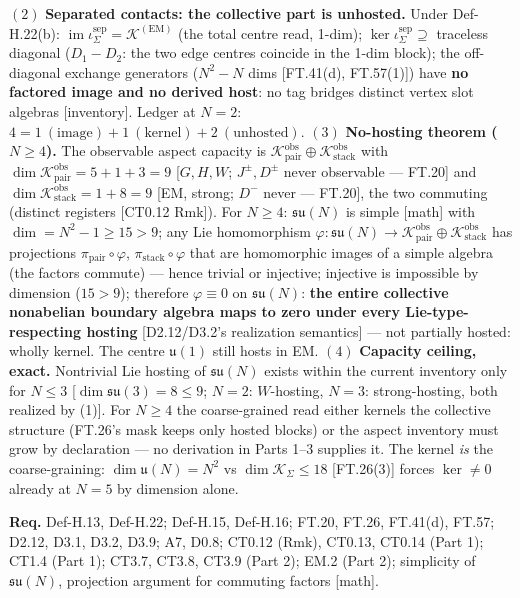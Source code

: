 \begin{theorem}
$(2)$ \textbf{Separated contacts: the collective part is unhosted.} Under Def-H.22(b): $\operatorname{im}\iota_\Sigma^{\mathrm{sep}}=\mathcal K^{(\mathrm{EM})}$ (the total centre read, 1-dim); $\ker\iota_\Sigma^{\mathrm{sep}}\supseteq$ traceless diagonal ($D_1-D_2$: the two edge centres coincide in the 1-dim block); the off-diagonal exchange generators ($N^2-N$ dims [FT.41(d), FT.57(1)]) have \textbf{no factored image and no derived host}: no tag bridges distinct vertex slot algebras [inventory]. Ledger at $N=2$: $4=1\ (\text{image})+1\ (\text{kernel})+2\ (\text{unhosted})$. $(3)$ \textbf{No-hosting theorem ($N\ge4$).} The observable aspect capacity is $\mathcal K_{\mathrm{pair}}^{\mathrm{obs}}\oplus\mathcal K_{\mathrm{stack}}^{\mathrm{obs}}$ with $\dim\mathcal K_{\mathrm{pair}}^{\mathrm{obs}}=5{+}1{+}3=9$ [$G,H,W$; $J^\pm,D^\pm$ never observable — FT.20] and $\dim\mathcal K_{\mathrm{stack}}^{\mathrm{obs}}=1{+}8=9$ [EM, strong; $D^-$ never — FT.20], the two commuting (distinct registers [CT0.12 Rmk]). For $N\ge4$: $\mathfrak{su}(N)$ is simple [math] with $\dim=N^2-1\ge15>9$; any Lie homomorphism $\varphi:\mathfrak{su}(N)\to\mathcal K_{\mathrm{pair}}^{\mathrm{obs}}\oplus\mathcal K_{\mathrm{stack}}^{\mathrm{obs}}$ has projections $\pi_{\mathrm{pair}}\circ\varphi$, $\pi_{\mathrm{stack}}\circ\varphi$ that are homomorphic images of a simple algebra (the factors commute) — hence trivial or injective; injective is impossible by dimension ($15>9$); therefore $\varphi\equiv0$ on $\mathfrak{su}(N)$: \textbf{the entire collective nonabelian boundary algebra maps to zero under every Lie-type-respecting hosting} [D2.12/D3.2's realization semantics] — not partially hosted: wholly kernel. The centre $\mathfrak u(1)$ still hosts in EM. $(4)$ \textbf{Capacity ceiling, exact.} Nontrivial Lie hosting of $\mathfrak{su}(N)$ exists within the current inventory only for $N\le3$ [$\dim\mathfrak{su}(3)=8\le9$; $N{=}2$: $W$-hosting, $N{=}3$: strong-hosting, both realized by (1)]. For $N\ge4$ the coarse-grained read either kernels the collective structure (FT.26's mask keeps only hosted blocks) or the aspect inventory must grow by declaration — no derivation in Parts 1–3 supplies it. The kernel \textit{is} the coarse-graining: $\dim\mathfrak u(N)=N^2$ vs $\dim\mathcal K_\Sigma\le18$ [FT.26(3)] forces $\ker\ne0$ already at $N=5$ by dimension alone.

\textbf{Req.} Def-H.13, Def-H.22; Def-H.15, Def-H.16; FT.20, FT.26, FT.41(d), FT.57; D2.12, D3.1, D3.2, D3.9; A7, D0.8; CT0.12 (Rmk), CT0.13, CT0.14 (Part 1); CT1.4 (Part 1); CT3.7, CT3.8, CT3.9 (Part 2); EM.2 (Part 2); simplicity of $\mathfrak{su}(N)$, projection argument for commuting factors [math].


\end{theorem}

